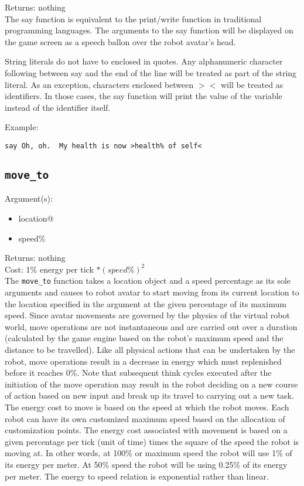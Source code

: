 \documentclass[a4paper]{article}
\begin{document}
\noindent Returns: nothing\\

The say function is equivalent to the print/write function in traditional programming languages.  The arguments to the say function will be displayed on the game screen as a speech ballon over the robot avatar's head.

String literals do not have to enclosed in quotes.  Any alphanumeric character following between say and the end of the line will be treated as part of the string literal.  As an exception, characters enclosed between $><$ will be treated as identifiers.  In those cases, the say function will print the value of the variable instead of the identifier itself.

Example:
\begin{verbatim}
say Oh, oh.  My health is now >health% of self<
\end{verbatim}

\subsection{\texttt{move\_to}}

Argument(s):
\begin{itemize}
	\item location@
	\item speed\%
\end{itemize}

\noindent Returns: nothing\\

\noindent Cost: 1\% energy per tick $* (speed\%)^2$\\

The \texttt{move\_to} function takes a location object and a speed percentage as its sole arguments and causes to robot avatar to start moving from its current location to the location specified in the argument at the given percentage of its maximum speed.  Since avatar movements are governed by the physics of the virtual robot world, move operations are not instantaneous and are carried out over a duration (calculated by the game engine based on the robot's maximum speed and the distance to be travelled).  Like all physical actions that can be undertaken by the robot, move operations result in a decrease in energy which must replenished before it reaches 0\%.  Note that subsequent think cycles executed after the initiation of the move operation may result in the robot deciding on a new course of action based on new input and break up its travel to carrying out a new task. The energy cost to move is based on the speed at which the robot moves. Each robot can have its own customized maximum speed based on the allocation of customization points. The energy cost associated with movement is based on a given percentage per tick (unit of time) times the square of the speed the robot is moving at. In other words, at 100\% or maximum speed the robot will use 1\% of its energy per meter. At 50\% speed the robot will be using 0.25\% of its energy per meter. The energy to speed relation is exponential rather than linear.
\end{document}
